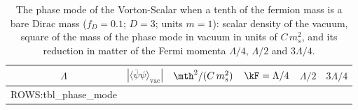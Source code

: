 \begin{table}
\caption{\label{tab:phasemode}The phase mode of the Vorton-Scalar when a tenth of the fermion mass
is a bare Dirac mass ($f_D=0.1$; $D=3$; units $m=1$): scalar density of the vacuum, square of the
mass of the phase mode in vacuum in units of $C\,m_s^{2}$, and its reduction in matter of the Fermi
momenta $\Lambda/4$, $\Lambda/2$ and $3\Lambda/4$.}
\begin{ruledtabular}
\begin{tabular}{cccccc}
$\Lambda$ & $|\langle\bar\psi\psi\rangle_{\mathrm{vac}}|$ & $\mth^{2}/(C\,m_s^{2})$ & $\kF=\Lambda/4$ & $\Lambda/2$ & $3\Lambda/4$ \\
\hline
{{ROWS:tbl_phase_mode}}
\end{tabular}
\end{ruledtabular}
\end{table}
